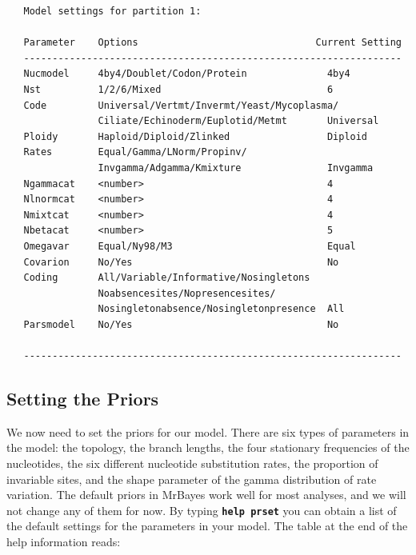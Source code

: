 \documentclass[12pt]{book}
\newcommand{\ttt}[1]{\texttt{#1}}
\newcommand{\tb}[1]{\ttt{\textbf{#1}}}
\begin{document}
\begin{singlespacing}
\footnotesize
\begin{verbatim}
   Model settings for partition 1:

   Parameter    Options                               Current Setting
   ------------------------------------------------------------------
   Nucmodel     4by4/Doublet/Codon/Protein              4by4
   Nst          1/2/6/Mixed                             6
   Code         Universal/Vertmt/Invermt/Yeast/Mycoplasma/
                Ciliate/Echinoderm/Euplotid/Metmt       Universal
   Ploidy       Haploid/Diploid/Zlinked                 Diploid
   Rates        Equal/Gamma/LNorm/Propinv/
                Invgamma/Adgamma/Kmixture               Invgamma
   Ngammacat    <number>                                4
   Nlnormcat    <number>                                4
   Nmixtcat     <number>                                4
   Nbetacat     <number>                                5
   Omegavar     Equal/Ny98/M3                           Equal
   Covarion     No/Yes                                  No
   Coding       All/Variable/Informative/Nosingletons
                Noabsencesites/Nopresencesites/
                Nosingletonabsence/Nosingletonpresence  All
   Parsmodel    No/Yes                                  No

   ------------------------------------------------------------------
\end{verbatim}
\normalsize
\end{singlespacing}

\subsection{Setting the Priors}
We now need to set the priors for our model. There are six types of parameters in the model: the
topology, the branch lengths, the four stationary frequencies of the nucleotides, the six different
nucleotide substitution rates, the proportion of invariable sites, and the shape parameter of the
gamma distribution of rate variation. The default priors in MrBayes work well for most analyses,
and we will not change any of them for now. By typing \tb{help prset} you can obtain a list of the
default settings for the parameters in your model. The table at the end of the help information
reads:
\end{document}
